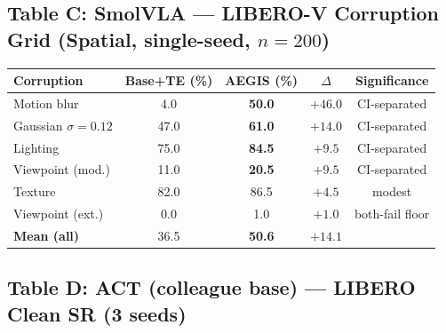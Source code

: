 \documentclass[11pt,a4paper]{article}
\newcommand{\win}[1]{{\color{frozengreen}\textbf{#1}}}
\begin{document}
\subsection*{Table C: SmolVLA — LIBERO-V Corruption Grid (Spatial, single-seed, $n=200$)}

\begin{table}[H]
\centering
\small
\begin{tabular}{lcccc}
\toprule
Corruption & Base+TE (\%) & AEGIS (\%) & $\Delta$ & Significance \\
\midrule
Motion blur       & 4.0  & \win{50.0} & $+46.0$ & CI-separated \\
Gaussian $\sigma=0.12$ & 47.0 & \win{61.0} & $+14.0$ & CI-separated \\
Lighting          & 75.0 & \win{84.5} & $+9.5$  & CI-separated \\
Viewpoint (mod.)  & 11.0 & \win{20.5} & $+9.5$  & CI-separated \\
Texture           & 82.0 & 86.5 & $+4.5$  & modest \\
Viewpoint (ext.)  & 0.0  & 1.0  & $+1.0$  & both-fail floor \\
\midrule
\textbf{Mean (all)} & 36.5 & \win{50.6} & $+14.1$ & \\
\bottomrule
\end{tabular}
\end{table}

\subsection*{Table D: ACT (colleague base) — LIBERO Clean SR (3 seeds)}
\end{document}
